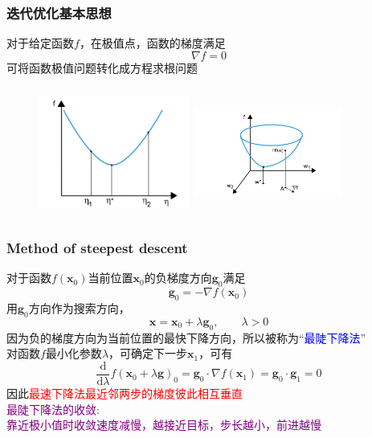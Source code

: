 \frame
{
	\frametitle{迭代优化基本思想}
	对于给定函数$f$，在极值点，函数的梯度满足
	\begin{displaymath}
		\nabla f=0
	\end{displaymath}
	可将函数极值问题转化成方程求根问题
\begin{figure}[h!]
\centering
\includegraphics[height=1.68in,width=1.95in,viewport=30 0 450 360,clip]{Figures/OP_mini-1.png}
\hskip 0.05in
\includegraphics[height=1.68in,width=1.95in,viewport=150 20 560 390,clip]{Figures/OP_mini-2.png}
\label{OP_mini}
\end{figure}
}

\frame
{
	\frametitle{\textrm{Method of steepest descent}}
	对于函数$f(\mathbf{x}_0)$当前位置$\mathbf{x}_0$的负梯度方向$\mathbf{g}_0$满足
	\begin{displaymath}
		\mathbf{g}_0=-\nabla f(\mathbf{x}_0)
	\end{displaymath}
	用$\mathbf{g}_0$方向作为搜索方向，
	\begin{displaymath}
		\mathbf{x}=\mathbf{x}_0+\lambda\mathbf{g}_0,\qquad \lambda>0
	\end{displaymath}
	因为负的梯度方向为当前位置的最快下降方向，所以被称为“\textcolor{blue}{最陡下降法}”\\
	对函数$f$最小化参数$\lambda$，可确定下一步$\mathbf{x}_1$，可有
	\begin{displaymath}
		\dfrac{\mathrm{d}}{\mathrm{d}\lambda}f(\mathbf{x}_0+\lambda\mathbf{g})_0=\mathbf{g}_0\cdot\nabla f(\mathbf{x}_1)=\mathbf{g}_0\cdot\mathbf{g}_1=0
	\end{displaymath}
	因此\textcolor{red}{最速下降法最近邻两步的梯度彼此相互垂直}\\
	\textcolor{purple}{最陡下降法的收敛:~\\靠近极小值时收敛速度减慢，越接近目标，步长越小，前进越慢}
}

